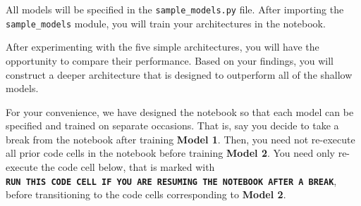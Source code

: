 \documentclass[11pt]{article}
\begin{document}
All models will be specified in the \texttt{sample\_models.py} file.
After importing the \texttt{sample\_models} module, you will train your
architectures in the notebook.

After experimenting with the five simple architectures, you will have
the opportunity to compare their performance. Based on your findings,
you will construct a deeper architecture that is designed to outperform
all of the shallow models.

For your convenience, we have designed the notebook so that each model
can be specified and trained on separate occasions. That is, say you
decide to take a break from the notebook after training \textbf{Model
1}. Then, you need not re-execute all prior code cells in the notebook
before training \textbf{Model 2}. You need only re-execute the code cell
below, that is marked with
\textbf{\texttt{RUN\ THIS\ CODE\ CELL\ IF\ YOU\ ARE\ RESUMING\ THE\ NOTEBOOK\ AFTER\ A\ BREAK}},
before transitioning to the code cells corresponding to \textbf{Model
2}.
\end{document}
